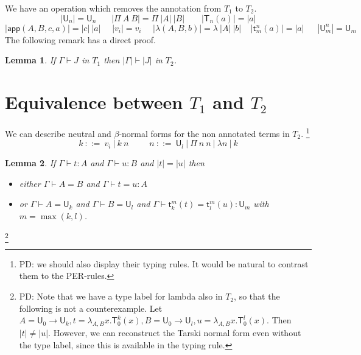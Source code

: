 \documentclass[11pt,a4paper]{article}
\newtheorem{lemma}{Lemma}[theorem]
\theoremstyle{definition}
\def\UU{\mathsf{U}}
\newcommand{\LAM}{\lambda}
\newcommand{\APP}{\mathsf{app}}
\newcommand{\T}{\mathsf{T}}
\newcommand{\sT}{\mathsf{t}}
\begin{document}
\medskip

We have an operation which removes the annotation from $T_1$ to $T_2$.
$$
|\UU_n| = \UU_n~~~~~~~~|\Pi~A~B| = \Pi~|A|~|B|~~~~~~~~~|\T_n(a)| = |a|
$$
$$
|\APP(A,B,c,a)| = |c|~|a|~~~~~~|v_i| = v_i~~~~~~|\LAM(A,B,b)| = \lambda~|A|~|b|~~~~~|\sT_m^n(a)| = |a|
~~~~~~~|\UU^n_m| = \UU_m
$$
The following remark has a direct proof.

\begin{lemma}
  If $\Gamma\vdash J$ in $T_1$ then $|\Gamma|\vdash |J|$ in $T_2$.
\end{lemma}


\section{Equivalence between $T_1$ and $T_2$}

 We can describe neutral and $\beta$-normal forms for the non annotated terms in $T_2$.
 \footnote{PD: we should also display their typing rules. It would be natural to contrast them to the PER-rules.}
 $$
 k~::=~v_i~|~k~n~~~~~~~~~~~n~::=~\UU_l~|~\Pi~n~n~|~\lambda n~|~k
 $$


\begin{lemma}
  If $\Gamma\vdash t:A$ and $\Gamma\vdash u:B$ and $|t| = |u|$ then
  \begin{itemize}
    \item either $\Gamma\vdash A = B$
      and $\Gamma\vdash t = u:A$
    \item or $\Gamma\vdash A = \UU_k$ and $\Gamma\vdash B = \UU_l$ and $\Gamma\vdash \sT_k^m(t) = \sT_l^m(u):\UU_m$ with $m = \max(k,l)$.
  \end{itemize}
\end{lemma}
\footnote{PD: Note that we have a type label for lambda also in $T_2$, so that the following is not a counterexample. Let $A = \UU_0 \to \UU_k, t = \lambda_{A,B} x.\T^k_0(x), B =  \UU_0 \to \UU_l, u = \lambda_{A,B} x.\T^l_0(x)$. Then $|t| \neq |u|$. However, we can reconstruct the Tarski normal form even without the type label, since this is available in the typing rule.}
\end{document}
